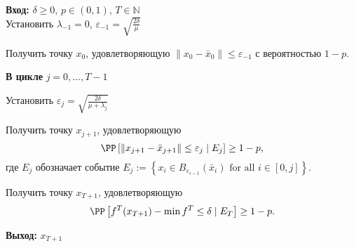 \begin{algorithm}[H]
    {\bf Вход:} $\delta\geq 0$, $p\in (0,1)$, $T\in \mathbb{N}$\\
	Установить $\lambda_{-1}=0$, $\varepsilon_{-1}=\sqrt{\frac{2\delta}{\mu}}$
	
	Получить точку $x_{0}$, удовлетворяющую $\|x_{0}-\bar x_0\|\leq \varepsilon_{-1}$ с вероятностью $1-p$.
	
	{\bf В цикле }{$j=0,\ldots,T-1$}{
    
	  \hspace{20pt} Установить $\varepsilon_{j}=\sqrt{\frac{2\delta}{\mu+\lambda_{j}}}$
	
	\hspace{20pt} 
	Получить точку $x_{j+1}$, удовлетворяющую
	\begin{equation}\label{eqn:keyesneededblah}
	\PP\left[\|x_{j+1}-\bar x_{j+1}\|\leq \varepsilon_{j} \mid E_{j}\right]\geq 1-p,
	\end{equation}
	\hspace{20pt} 
	где $E_j$ обозначает событие $E_j:=\left\{x_i\in B_{\varepsilon_{i-1}}(\bar x_i)\textrm{ for all }i\in [0,j]\right\}$.}

\smallskip
Получить точку $x_{T+1}$, удовлетворяющую
	\begin{equation}\label{eqn:clean_up}
	\PP\left[f^{T}(x_{T+1})-\min f^{T}\leq \delta \mid E_{T}\right]\geq 1-p.
	\end{equation}
	
	{\bf Выход:} $x_{T+1}$
	
	
	\caption{$\cb(\delta, p, T)$	%
	}
	\label{alg: proxBoost}
\end{algorithm}


